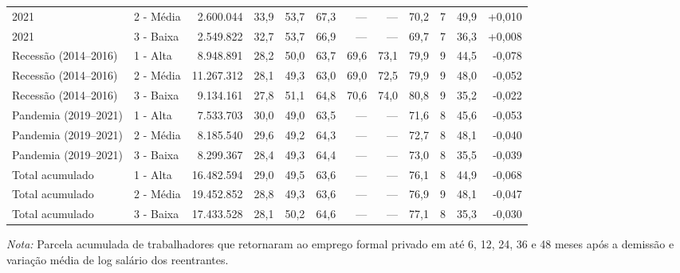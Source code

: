 {\begin{tabular}{llrrrrrrrrrr}
2021 & 2 - Média & 2.600.044 & 33,9 & 53,7 & 67,3 & --- & --- & 70,2 & 7 & 49,9 & +0,010 \\
2021 & 3 - Baixa & 2.549.822 & 32,7 & 53,7 & 66,9 & --- & --- & 69,7 & 7 & 36,3 & +0,008 \\
\addlinespace[3pt]
Recessão (2014–2016) & 1 - Alta & 8.948.891 & 28,2 & 50,0 & 63,7 & 69,6 & 73,1 & 79,9 & 9 & 44,5 & -0,078 \\
Recessão (2014–2016) & 2 - Média & 11.267.312 & 28,1 & 49,3 & 63,0 & 69,0 & 72,5 & 79,9 & 9 & 48,0 & -0,052 \\
Recessão (2014–2016) & 3 - Baixa & 9.134.161 & 27,8 & 51,1 & 64,8 & 70,6 & 74,0 & 80,8 & 9 & 35,2 & -0,022 \\
\addlinespace[3pt]
Pandemia (2019–2021) & 1 - Alta & 7.533.703 & 30,0 & 49,0 & 63,5 & --- & --- & 71,6 & 8 & 45,6 & -0,053 \\
Pandemia (2019–2021) & 2 - Média & 8.185.540 & 29,6 & 49,2 & 64,3 & --- & --- & 72,7 & 8 & 48,1 & -0,040 \\
Pandemia (2019–2021) & 3 - Baixa & 8.299.367 & 28,4 & 49,3 & 64,4 & --- & --- & 73,0 & 8 & 35,5 & -0,039 \\
\addlinespace[3pt]
Total acumulado & 1 - Alta & 16.482.594 & 29,0 & 49,5 & 63,6 & --- & --- & 76,1 & 8 & 44,9 & -0,068 \\
Total acumulado & 2 - Média & 19.452.852 & 28,8 & 49,3 & 63,6 & --- & --- & 76,9 & 9 & 48,1 & -0,047 \\
Total acumulado & 3 - Baixa & 17.433.528 & 28,1 & 50,2 & 64,6 & --- & --- & 77,1 & 8 & 35,3 & -0,030 \\
\bottomrule
\end{tabular}
\vspace{2pt}
\par{\footnotesize \textit{Nota:} Parcela acumulada de trabalhadores que retornaram ao emprego formal privado em até 6, 12, 24, 36 e 48 meses após a demissão e variação média de log salário dos reentrantes.}
}
